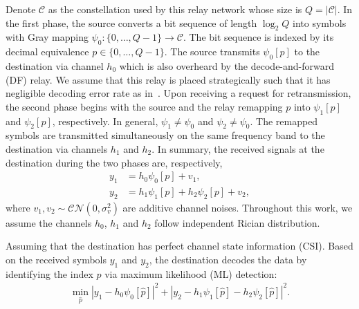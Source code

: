 \documentclass[journal]{IEEEtran}
\begin{document}
Denote $\mathcal{C}$ as the constellation used by this relay network whose size
is $Q = |\mathcal{C}|$. In the first phase, the source converts a bit sequence
of length $\log_2Q$ into symbols with Gray mapping $\psi_0: \{0,\ldots,Q -
1\}\rightarrow \mathcal{C}$. The bit sequence is indexed by its decimal
equivalence $p\in \{0,\ldots,Q - 1\}$. The source transmits $\psi_0[p]$ to the
destination via channel $h_0$ which is also overheard by the decode-and-forward
(DF) relay. We assume that this relay is placed strategically such that it has
negligible decoding error rate as in~\cite{ryu2011ber, kim2009design}. Upon
receiving a request for retransmission, the second phase begins with
the source and the relay remapping $p$ into $\psi_1[p]$ and $\psi_2[p]$,
respectively.  In general,  $\psi_1\not=\psi_0$ and $\psi_2\not=\psi_0$. The
remapped symbols are transmitted simultaneously on the same frequency band to the
destination via channels $h_1$ and $h_2$. In summary, the received signals at the
destination during the two phases are, respectively, 
\begin{subequations}
    \begin{align}
       y_1 & = h_0\psi_0[p] + v_1, \\
       y_2 & = h_1\psi_1[p] + h_2\psi_2[p] + v_2,
    \end{align}
\end{subequations}
where $v_1, v_2\sim\mathcal{CN}(0,\sigma_v^2)$ are additive channel noises.
Throughout this work, we assume the channels $h_0$, $h_1$ and $h_2$ follow
independent Rician distribution.

Assuming that the destination has perfect channel state information (CSI). Based
on the received symbols $y_1$ and $y_2$,  the destination decodes the data by
identifying the index $p$ via maximum likelihood (ML) detection:
\begin{align}
    \min_{\hat{p}} |y_1 - h_0\psi_0[\hat{p}]|^2 + |y_2-
    h_1\psi_1[\hat{p}] - h_2\psi_2[\hat{p}]|^2.
    \label{eq:ML}
\end{align}

%
%
\end{document}
